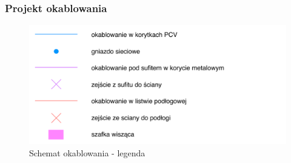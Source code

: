 \paragraph{}


\subsubsection{Projekt okablowania}
\begin{figure}[H]
  \begin{center}
    \includegraphics[scale=1.0]{img/s/legenda.pdf}
    \caption{Schemat okablowania - legenda}
  \end{center}
\end{figure}


